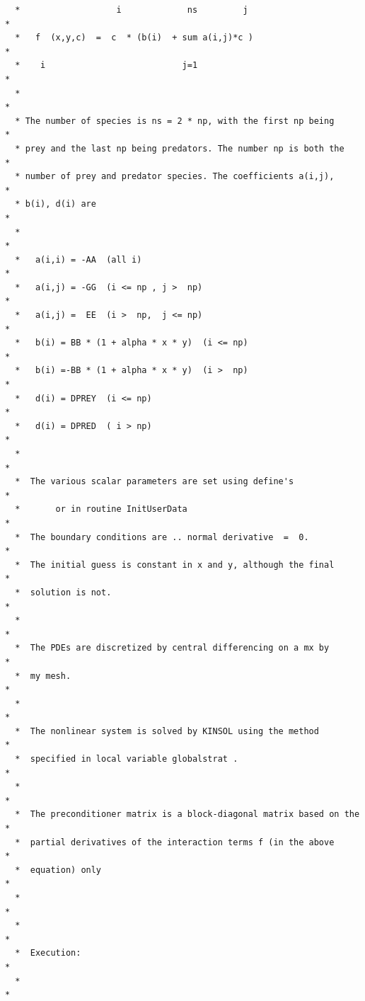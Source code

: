 \documentclass[11pt]{article}
\begin{document}
\begin{verbatim}
  *                   i             ns         j                       *
  *   f  (x,y,c)  =  c  * (b(i)  + sum a(i,j)*c )                      *
  *    i                           j=1                                 *
  *                                                                    *
  * The number of species is ns = 2 * np, with the first np being      *
  * prey and the last np being predators. The number np is both the    *
  * number of prey and predator species. The coefficients a(i,j),      *
  * b(i), d(i) are                                                     *
  *                                                                    *
  *   a(i,i) = -AA  (all i)                                            *
  *   a(i,j) = -GG  (i <= np , j >  np)                                *
  *   a(i,j) =  EE  (i >  np,  j <= np)                                *
  *   b(i) = BB * (1 + alpha * x * y)  (i <= np)                       *
  *   b(i) =-BB * (1 + alpha * x * y)  (i >  np)                       *
  *   d(i) = DPREY  (i <= np)                                          *
  *   d(i) = DPRED  ( i > np)                                          *
  *                                                                    *
  *  The various scalar parameters are set using define's              *
  *       or in routine InitUserData                                   *
  *  The boundary conditions are .. normal derivative  =  0.           *
  *  The initial guess is constant in x and y, although the final      *
  *  solution is not.                                                  *
  *                                                                    *
  *  The PDEs are discretized by central differencing on a mx by       *
  *  my mesh.                                                          *
  *                                                                    *
  *  The nonlinear system is solved by KINSOL using the method         *
  *  specified in local variable globalstrat .                         *
  *                                                                    *
  *  The preconditioner matrix is a block-diagonal matrix based on the *
  *  partial derivatives of the interaction terms f (in the above      *
  *  equation) only                                                    *
  *                                                                    *
  *                                                                    *
  *  Execution:                                                        *
  *                                                                    *

\end{verbatim}
\end{document}
